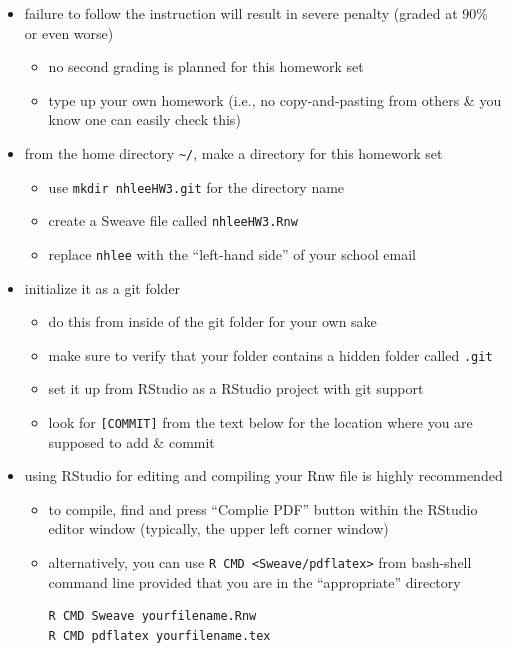 \documentclass[12pt]{article}
\begin{document}
\begin{itemize}
    \item failure to follow the instruction will result in severe penalty
        (graded at 90\% or even worse)
    \begin{itemize}
        \item no second grading is planned for this homework set 
        \item type up your own homework (i.e., no copy-and-pasting from others
            \& you know one can easily check this)
    \end{itemize}
    \item from the home directory \verb+~/+, make a directory for this homework set
        \begin{itemize}
            \item use \verb+mkdir nhleeHW3.git+ for the directory name
            \item create a Sweave file called \verb+nhleeHW3.Rnw+ 
            \item replace \verb+nhlee+ with the ``left-hand side'' of your school email
        \end{itemize}
    \item initialize it as a git folder 
        \begin{itemize}
            \item do this from inside of the git folder for your own sake
            \item make sure to verify that your folder contains a hidden folder called \verb+.git+
            \item set it up from RStudio as a RStudio project with git support
            \item look for \verb+[COMMIT]+ from the text below for the location where you are supposed to add \& commit 
        \end{itemize}
    \item using RStudio for editing and compiling your Rnw file is highly
        recommended 
        \begin{itemize}
            \item to compile, find and press ``Complie PDF'' button within the
                RStudio editor window (typically, the upper left corner window)
            \item alternatively, you can use \verb+R CMD <Sweave/pdflatex>+ from bash-shell
                command line provided that you are in the ``appropriate'' directory
                \begin{lstlisting}
R CMD Sweave yourfilename.Rnw
R CMD pdflatex yourfilename.tex
                \end{lstlisting}
        \end{itemize}


\end{itemize}
\end{document}
